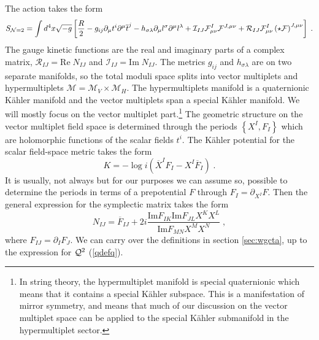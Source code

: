 \documentclass[11pt,a4paper]{article}
\numberwithin{equation}{section}
\numberwithin{table}{section}\setlength{\multlinegap}{25pt}
\newcommand{\cI}{\mathcal{I}}
\newcommand{\cR}{\mathcal{R}}
\newcommand{\cM}{\mathcal M}
\newcommand{\be}{\begin{equation}}
\newcommand{\ee}{\end{equation}}
\begin{document}
The action takes the form 
\be
S_{{\cal N}=2} = \int d^4x \sqrt{-g} \left[ \frac{R}{2} - g_{ij}\partial_{\mu} t^i \partial^{\mu} \overline{t}^{j} - h_{\sigma \lambda} \partial_{\mu}l^{\sigma}\partial^{\mu} l^{\lambda} + {\cal I}_{IJ} {\cal F}_{\mu\nu}^{I} {\cal F}^{J,\mu\nu} +  {\cal R}_{IJ} {\cal F}_{\mu\nu}^{I} \left(\star {\cal F}\right)^{J,\mu\nu} \right] \;.     \label{N2action}
\ee
The gauge kinetic functions are the real and imaginary parts of a complex matrix, $\cR_{IJ} =\mathrm{Re\;} N_{IJ}$ and $\cI_{IJ} =\mathrm{Im\;} N_{IJ}$. The metrics $g_{ij}$ and $h_{\sigma\lambda}$ are on two separate manifolds, so the total moduli space splits into vector multiplets and hypermultiplets $\cM = \cM_V \times \cM_H$. The hypermultiplets manifold is a quaternionic K{\"a}hler manifold and the vector multiplets span a special K{\"a}hler manifold. We will mostly focus on the vector multiplet part.\footnote{In string theory, the hypermultiplet manifold is special quaternionic which means that it contains a special K{\"a}hler subspace. This is a manifestation of mirror symmetry, and means that much of our discussion on the vector multiplet space can be applied to the special K{\"a}hler submanifold in the hypermultiplet sector.} The geometric structure on the vector multiplet field space is determined through the periods $\left\{X^I,F_I\right\}$ which are holomorphic functions of the scalar fields $t^i$. The K{\"a}hler potential for the scalar field-space metric takes the form 
\be
K = -\log i\left( \overline{X}^I F_I - X^I \overline{F}_I \right) \;. \label{N2KahlerPot}
\ee
It is usually, not always but for our purposes we can assume so, possible to determine the periods in terms of a prepotential $F$ through $F_I=\partial_{X^I} F$. Then the general expression for the symplectic matrix takes the form
\be
N_{IJ} = \overline{F}_{IJ} + 2i \frac{\mathrm{Im} F_{IK} \mathrm{Im} F_{JL} X^K X^L }{\mathrm{Im} F_{MN} X^MX^N} \;,
\ee
where $F_{IJ} = \partial_I F_J$. We can carry over the definitions in section \ref{sec:wgcta}, up to the expression for ${\cal Q}^2$ (\ref{qdefq}).
\end{document}
